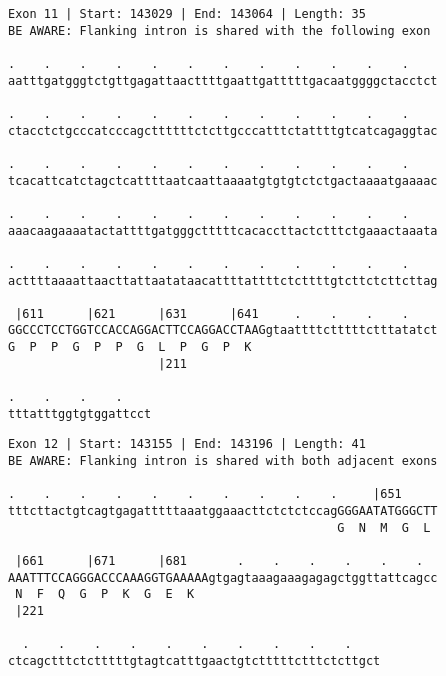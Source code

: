 \documentclass{article}
\begin{document}
\begin{Verbatim}
Exon 11 | Start: 143029 | End: 143064 | Length: 35
BE AWARE: Flanking intron is shared with the following exon
 
.    .    .    .    .    .    .    .    .    .    .    .    
aatttgatgggtctgttgagattaacttttgaattgatttttgacaatggggctacctct
  
.    .    .    .    .    .    .    .    .    .    .    .    
ctacctctgcccatcccagcttttttctcttgcccatttctattttgtcatcagaggtac
  
.    .    .    .    .    .    .    .    .    .    .    .    
tcacattcatctagctcattttaatcaattaaaatgtgtgtctctgactaaaatgaaaac
  
.    .    .    .    .    .    .    .    .    .    .    .    
aaacaagaaaatactattttgatgggctttttcacaccttactctttctgaaactaaata
  
.    .    .    .    .    .    .    .    .    .    .    .    
acttttaaaattaacttattaatataacattttattttctcttttgtcttctcttcttag
  
 |611      |621      |631      |641     .    .    .    .    
GGCCCTCCTGGTCCACCAGGACTTCCAGGACCTAAGgtaattttctttttctttatatct
G  P  P  G  P  P  G  L  P  G  P  K                          
                     |211                                   
  
.    .    .    .    
tttatttggtgtggattcct
\end{Verbatim}
\newpage
\begin{Verbatim}
Exon 12 | Start: 143155 | End: 143196 | Length: 41
BE AWARE: Flanking intron is shared with both adjacent exons
 
.    .    .    .    .    .    .    .    .    .     |651     
tttcttactgtcagtgagatttttaaatggaaacttctctctccagGGGAATATGGGCTT
                                              G  N  M  G  L 
  
 |661      |671      |681       .    .    .    .    .    .  
AAATTTCCAGGGACCCAAAGGTGAAAAAgtgagtaaagaaagagagctggttattcagcc
 N  F  Q  G  P  K  G  E  K                                  
 |221                                                       
  
  .    .    .    .    .    .    .    .    .    .    
ctcagctttctctttttgtagtcatttgaactgtctttttctttctcttgct
\end{Verbatim}
\newpage
\end{document}
